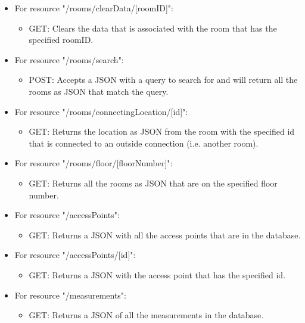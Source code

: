 \begin{itemize}
    \item For resource "/rooms/clearData/[roomID]":
    \begin{itemize}
        \item GET: Clears the data that is associated with the room that has the specified roomID.
    \end{itemize}
    
    \item For resource "/rooms/search":
    \begin{itemize}
        \item POST: Accepts a JSON with a query to search for and will return all the rooms as JSON that match the query.
    \end{itemize}
    
    \item For resource "/rooms/connectingLocation/[id]":
    \begin{itemize}
        \item GET: Returns the location as JSON from the room with the specified id that is connected to an outside connection (i.e. another room).
    \end{itemize}
    
    \item For resource "/rooms/floor/[floorNumber]":
    \begin{itemize}
        \item GET: Returns all the rooms as JSON that are on the specified floor number.
    \end{itemize}
    
    \item For resource "/accessPoints":
    \begin{itemize}
        \item GET: Returns a JSON with all the access points that are in the database.
    \end{itemize}
    
    \item For resource "/accessPoints/[id]":
    \begin{itemize}
        \item GET: Returns a JSON with the access point that has the specified id.
    \end{itemize}
    
    \item For resource "/measurements":
    \begin{itemize}
        \item GET: Returns a JSON of all the measurements in the database.
    \end{itemize}
    

\end{itemize}
